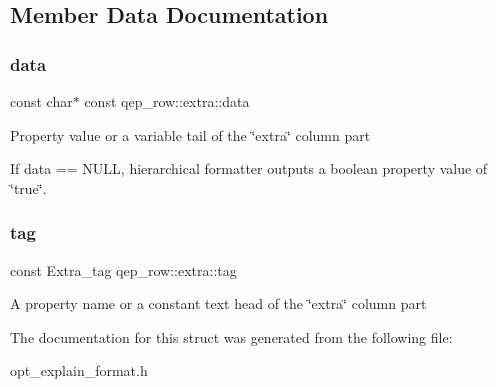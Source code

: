 \subsection{Member Data Documentation}
\mbox{\label{structqep__row_1_1extra_aff5697395d1ac5ec1d0aa9a9809979f1}} 
\subsubsection{\texorpdfstring{data}{data}}
{\footnotesize\ttfamily const char$\ast$ const qep\+\_\+row\+::extra\+::data}

Property value or a variable tail of the \char`\"{}extra\char`\"{} column part

If data == N\+U\+LL, hierarchical formatter outputs a boolean property value of \char`\"{}true\char`\"{}. \mbox{\label{structqep__row_1_1extra_af4492316c31fc24a65e9dffe13fd6465}} 
\subsubsection{\texorpdfstring{tag}{tag}}
{\footnotesize\ttfamily const Extra\+\_\+tag qep\+\_\+row\+::extra\+::tag}

A property name or a constant text head of the \char`\"{}extra\char`\"{} column part 

The documentation for this struct was generated from the following file\+:\begin{DoxyCompactItemize}
\item 
opt\+\_\+explain\+\_\+format.\+h\end{DoxyCompactItemize}
